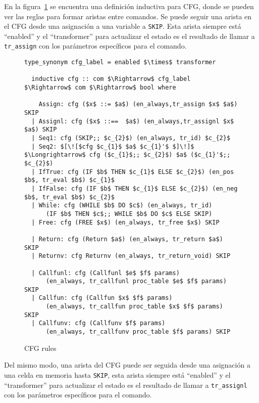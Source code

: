 En la figura~\ref{fig:cfg_rules} se encuentra una definición inductiva para CFG, donde se pueden ver las reglas para formar aristas entre comandos.
Se puede seguir una arista en el CFG desde una asignación a una variable a \verb|SKIP|.
Esta arista siempre está ``enabled'' y el  ``transformer'' para actualizar el estado es el resultado de llamar a \verb|tr_assign| con los parámetros específicos para el comando.

\begin{figure} 
  \begin{lstlisting}[frame=single, mathescape=true]
  type_synonym cfg_label = enabled $\times$ transformer

  inductive cfg :: com $\Rightarrow$ cfg_label $\Rightarrow$ com $\Rightarrow$ bool where

    Assign: cfg ($x$ ::= $a$) (en_always,tr_assign $x$ $a$) SKIP
  | Assignl: cfg ($x$ ::==  $a$) (en_always,tr_assignl $x$ $a$) SKIP
  | Seq1: cfg (SKIP;; $c_{2}$) (en_always, tr_id) $c_{2}$
  | Seq2: $[\![$cfg $c_{1}$ $a$ $c_{1}'$ $]\!]$ $\Longrightarrow$ cfg ($c_{1}$;; $c_{2}$) $a$ ($c_{1}'$;; $c_{2}$)
  | IfTrue: cfg (IF $b$ THEN $c_{1}$ ELSE $c_{2}$) (en_pos $b$, tr_eval $b$) $c_{1}$
  | IfFalse: cfg (IF $b$ THEN $c_{1}$ ELSE $c_{2}$) (en_neg $b$, tr_eval $b$) $c_{2}$
  | While: cfg (WHILE $b$ DO $c$) (en_always, tr_id)
      (IF $b$ THEN $c$;; WHILE $b$ DO $c$ ELSE SKIP)
  | Free: cfg (FREE $x$) (en_always, tr_free $x$) SKIP

  | Return: cfg (Return $a$) (en_always, tr_return $a$) SKIP
  | Returnv: cfg Returnv (en_always, tr_return_void) SKIP

  | Callfunl: cfg (Callfunl $e$ $f$ params)
      (en_always, tr_callfunl proc_table $e$ $f$ params) SKIP
  | Callfun: cfg (Callfun $x$ $f$ params)
      (en_always, tr_callfun proc_table $x$ $f$ params) SKIP
  | Callfunv: cfg (Callfunv $f$ params)
      (en_always, tr_callfunv proc_table $f$ params) SKIP
  \end{lstlisting}

  \caption{CFG rules}
  \label{fig:cfg_rules}
\end{figure}

Del mismo modo, una arista del CFG puede ser seguida desde una asignación a una celda en memoria hasta \verb|SKIP|, esta arista siempre está ``enabled'' y el ``transformer'' para actualizar el estado es el resultado de llamar a \verb|tr_assignl| con los parámetros específicos para el comando.

